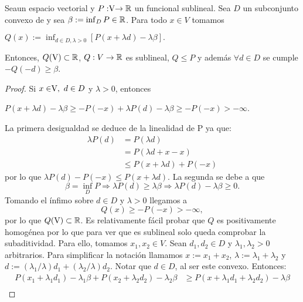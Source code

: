 \bigskip 
	\begin{lemaBox}\label{lema2}
		Sea\vecSpace un espacio vectorial y $P:\vecSpace \rightarrow \RR$ un funcional sublineal. Sea $ D $ un subconjunto convexo de \vecSpace y sea $ \beta := \inf_D P \in \mathbb{R} $. Para todo $ x \in V $ tomamos  
		\begin{center}
			$ Q(x) := \inf_{d \in D, \lambda > 0} \left[P(x+\lambda d) - \lambda \beta\right]. $
		\end{center}
		Entonces, $ Q(\vecSpace) \subset \RR $, $ Q:V \rightarrow \mathbb{R}$ es sublineal, $ Q \leq P $ y además $ \forall d \in D$ se cumple  $-Q(-d) \geq \beta$.
	\end{lemaBox} 
	\begin{proof}
		Si $ x \in \vecSpace,\text{ }d \in D $ y $ \lambda > 0 $, entonces
		\begin{center}
			$ P(x+ \lambda d) - \lambda \beta \geq -P(-x) + \lambda P(d)-\lambda\beta \geq -P(-x) > -\infty$.
		\end{center}
		La primera desigualdad se deduce de la linealidad de P ya que:
		\begin{equation*}
		\begin{split}
		\lambda P(d) &= P(\lambda d) \\ 
		&=P(\lambda d +x-x) \\ 
		&\leq P(x+\lambda d)+ P(-x)
		\end{split}
		\end{equation*}
		por lo que $ \lambda P(d)-P(-x) \leq P(x+\lambda d) $. La segunda se debe a que
		\[\beta = \inf_D P \Longrightarrow \lambda P(d) \geq \lambda\beta \Longrightarrow\lambda P(d) - \lambda\beta \geq 0. \]
		Tomando el ínfimo sobre $ d \in D  $ y $ \lambda > 0 $ llegamos a \[ Q(x)\geq -P(-x) > -\infty,\] por lo que $ Q(\vecSpace) \subset \RR$. Es relativamente fácil probar que $ Q $ es positivamente homogénea por lo que para ver que es sublineal solo queda comprobar la subaditividad. Para ello, tomamos $ x_1, x_2 \in V $. Sean $ d_1, d_2 \in D $ y $ \lambda_1, \lambda_2 > 0$ arbitrarios. Para simplificar la notación llamamos $ x := x_1 + x_2 $, $ \lambda := \lambda_1 + \lambda_2 $ y $ d:= (\lambda_1/\lambda)d_1 + (\lambda_2/\lambda)d_2 $. Notar que $ d \in D $, al ser este convexo. Entonces: 
		\begin{equation*}
		\begin{split}
		 P(x_1 + \lambda_1 d_1) - \lambda_1 \beta  +  P(x_2 + \lambda_2 d_2) - \lambda_2 \beta &\geq P(x + \lambda_1 d_1 + \lambda_2 d_2) - \lambda \beta\\

\end{split}
\end{equation*}
\end{proof}
